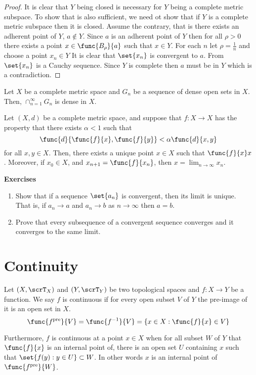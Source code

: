 \begin{proof}
    It is clear that \(Y\) being closed is necessary for \(Y\) being a complete metric subspace. To show that is also sufficient, we need ot show that if \(Y\) is a complete metric subspace then it is closed. Assume the contrary, that is there exists an adherent point of \(Y\), \(a \notin Y\). Since \(a\) is an adherent point of \(Y\) then for all \(\rho > 0\) there exists a point \(x \in \func{B_\rho}{a}\) such that \(x \in Y\). For each \(n\) let \(\rho = \frac{1}{n}\) and choose a point \(x_n \in Y\)
    It is clear that \(\set{ x_n }\) is convergent to \(a\). From  \(\set{ x_n }\) is a Cauchy sequence. Since \(Y\) is complete then \(a\) must be in \(Y\) which is a contradiction.
\end{proof}

\begin{theorem}
    Let \(X\) be a complete metric space and \(G_n\) be a sequence of dense open sets in \(X\). Then, \(\cap_{n = 1}^{\infty} G_n\) is dense in \(X\).
\end{theorem}

\begin{theorem}
    Let \((X,d)\) be a complete metric space, and suppose that \(f:X \to X\) has the property that there exists \(\alpha < 1 \) such that 
    \begin{equation*}
        \func{d}{\func{f}{x}, \func{f}{y}} < \alpha \func{d}{x,y}
    \end{equation*}
    for all \(x,y \in X\). Then, there exists a unique point \(x \in X\) such that \(\func{f}{x} x\). Moreover, if \(x_0 \in X\), and \(x_{n+1} = \func{f}{x_n}\), then \(x = \lim_{n \to \infty} x_n\).
\end{theorem}
{\Large\textbf{Exercises}}
\begin{enumerate}
    \item Show that if a sequence \(\set{ a_n }\) is convergent, then its limit is unique. That is, if \(a_n \to a \) and \(a_n \to b\) as \(n \to \infty\) then \(a = b\).
    \item Prove that every subsequence of a convergent sequence converges and it converges to the same limit.
\end{enumerate}
\newpage

\section{Continuity}
\begin{definition} [Continuity]
    Let \((X,\scrT_X)\) and \((Y,\scrT_Y)\) be two topological spaces and \(f : X \to Y\) be a function. We say \(f\) is continuous if for every open subset \(V\) of \(Y\) the pre-image of it is an open set in \(X\).
    \[\func{f^{\mathrm{pre}}}{V}= \func{f^{-1}}{V} = \{ x \in X : \func{f}{x} \in V\} \]

    Furthermore, \(f\) is continuous at a point \(x \in X\) when for all subset \(W\) of  \(Y\) that \( \func{f}{x} \) is an internal point of, there is an open set \(U\) containing \(x\) such that \(\set{ f(y) : y \in U } \subset W\). In other words \(x\) is an internal point of \(\func{f^{\mathrm{pre}}}{W}\).
\end{definition}

